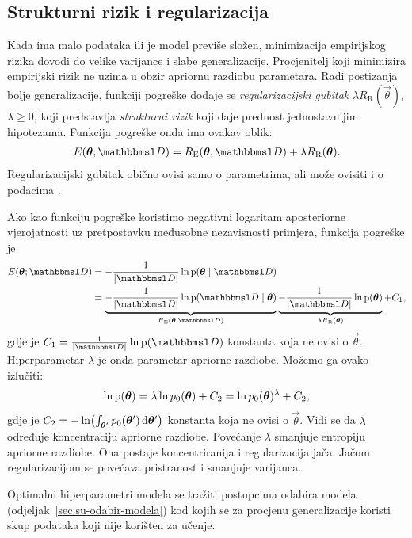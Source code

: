\documentclass[utf8, diplomski, lmodern]{fer}
\begin{document}
\subsection{Strukturni rizik i regularizacija}

Kada ima malo podataka ili je model previše složen, minimizacija empirijskog rizika dovodi do velike varijance i slabe generalizacije. Procjenitelj koji minimizira empirijski rizik ne uzima u obzir apriornu razdiobu parametara. Radi postizanja bolje generalizacije, funkciji pogreške dodaje se \emph{regularizacijski gubitak} $\lambda R_\text{R}(\vec\theta)$, $\lambda\geq0$, koji predstavlja \emph{strukturni rizik} koji daje prednost jednostavnijim hipotezama. Funkcija pogreške onda ima ovakav oblik:
\begin{align}
E(\vec\theta;\set{D}) = R_\text{E}(\vec\theta;\set{D}) + \lambda R_\text{R}(\vec\theta) \text{.}
\end{align}
Regularizacijski gubitak obično ovisi samo o parametrima, ali može ovisiti i o podacima \citep{Goodfellow:2016:DL}. 

Ako kao funkciju pogreške koristimo negativni logaritam aposteriorne vjerojatnosti uz pretpostavku međusobne nezavisnosti primjera, funkcija pogreške je
\begin{align}
E(\vec\theta;\set{D}) 
&= -\frac{1}{\envert{\set D}}\ln\p(\vec\theta\mid\set{D}) \\
&= 
\underbrace{-\frac{1}{\envert{\set D}}\ln\p(\set{D}\mid\vec\theta)}_{R_\text{E}(\vec\theta;\set{D})}
\underbrace{-\frac{1}{\envert{\set D}}\ln\p(\vec\theta)}_{\lambda R_\text{R}(\vec\theta)} + C_1
\text{,}
\end{align}
gdje je $C_1=\frac{1}{\envert{\set D}}\ln\p(\set D)$ konstanta koja ne ovisi o $\vec\theta$. Hiperparametar $\lambda$ je onda parametar apriorne razdiobe. Možemo ga ovako izlučiti:
\begin{align}
\ln\p(\vec\theta)=\lambda \ln p_0(\vec\theta) +C_2 = \ln p_0(\vec\theta)^\lambda +C_2 \text{,}
\end{align}
gdje je $C_2=-\ln\del{\int_{\vec{\theta'}}p_0(\vec\theta')\dif\vec{\theta'}}$ konstanta koja ne ovisi o $\vec\theta$. Vidi se da $\lambda$ određuje koncentraciju apriorne razdiobe. Povećanje $\lambda$ smanjuje entropiju apriorne razdiobe. Ona postaje koncentriranija i regularizacija jača. Jačom regularizacijom se povećava pristranost i smanjuje varijanca.

Optimalni hiperparametri modela se tražiti postupcima odabira modela (odjeljak~\ref{sec:su-odabir-modela}) kod kojih se za procjenu generalizacije koristi skup podataka koji nije korišten za učenje.
\end{document}
